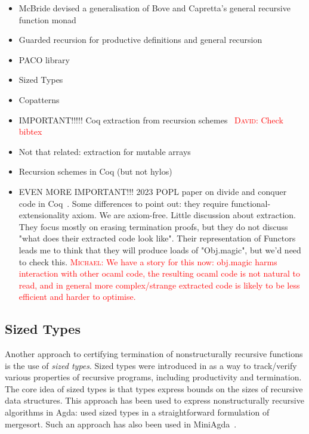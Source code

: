 \documentclass{article}
\newcommand{\dcas}[1]{\textcolor{red}{\textsc{David}: #1}}
\newcommand{\mvol}[1]{\textcolor{red}{\textsc{Michael}: #1}}
\begin{document}
\begin{itemize}
  \item McBride devised a generalisation of Bove and Capretta's general
recursive function monad~\cite{McBride15, BoveC01}
  \item Guarded recursion for productive definitions and general recursion
~\cite{AtkeyM13, PaviottiMB15}
  \item PACO library~\cite{HurNDV13}
  \item Sized Types \cite{HughesPS96, abs-1202-3496}
  \item Copatterns \cite{AbelPTS13, AbelP16}
  \item IMPORTANT!!!!! Coq extraction from recursion
    schemes~\cite{larchey2022braga} \dcas{Check bibtex}
  \item Not that related: extraction for mutable arrays~\cite{SAKAGUCHI2020102372}
  \item Recursion schemes in Coq (but not hylos)~\cite{MurataE19}
  \item EVEN MORE IMPORTANT!!! 2023 POPL paper on divide and conquer code in
    Coq~\cite{AbreuDHJMS23}.  Some differences to point out: they require
    functional-extensionality axiom. We are axiom-free. Little discussion about
    extraction. They focus mostly on erasing termination proofs, but they do
    not discuss "what does their extracted code look like". Their
    representation of Functors leads me to think that they will produce loads
    of "Obj.magic", but we'd need to check this. \mvol{We have a story for this now: obj.magic harms interaction with other ocaml code, the resulting ocaml code is not natural to read, and in general more complex/strange extracted code is likely to be less efficient and harder to optimise.}
\end{itemize}

\subsection{Sized Types}

Another approach to certifying termination of nonstructurally recursive
functions is the use of \emph{sized types}. Sized types were introduced in
\textcite{HughesPS96} as a way to track/verify various properties of recursive
programs, including productivity and termination. The core idea of sized types
is that types express bounds on the sizes of recursive data structures. This
approach has been used to express nonstructurally recursive algorithms in Agda:
\textcite{CopelloTB14} used sized types in a straightforward formulation of
mergesort. Such an approach has also been used in MiniAgda~\cite{abs-1202-3496}.


\printbibliography[heading=bibintoc]
\end{document}
